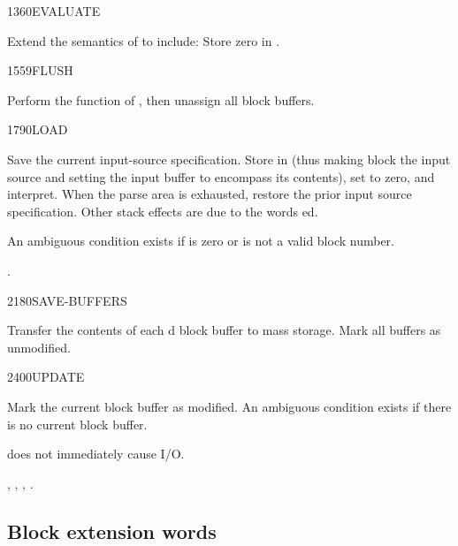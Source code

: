 \begin{worddef}{1360}{EVALUATE}
\item Extend the semantics of  to
	include: Store zero in .
\end{worddef}


\begin{worddef}{1559}{FLUSH}
\item \stack{}{}

	Perform the function of , then unassign all
	block buffers.
\end{worddef}


\begin{worddef}{1790}{LOAD}
\item {}

	Save the current input-source specification. Store  in
	 (thus making block  the input source and
	setting the input buffer to encompass its contents), set
	 to zero, and interpret. When the parse area is
	exhausted, restore the prior input source specification. Other
	stack effects are due to the words ed.

	An ambiguous condition exists if  is zero or is not a
	valid block number.

\see {}.
\end{worddef}


\begin{worddef}{2180}{SAVE-BUFFERS}
\item \stack{}{}

	Transfer the contents of each d block buffer to
	mass storage. Mark all buffers as unmodified.
\end{worddef}


\begin{worddef}{2400}{UPDATE}
\item \stack{}{}

	Mark the current block buffer as modified. An ambiguous
	condition exists if there is no current block buffer.

	 does not immediately cause I/O.

\see {},
	,
	,
	.
\end{worddef}


\subsection{Block extension words} %
\extended

